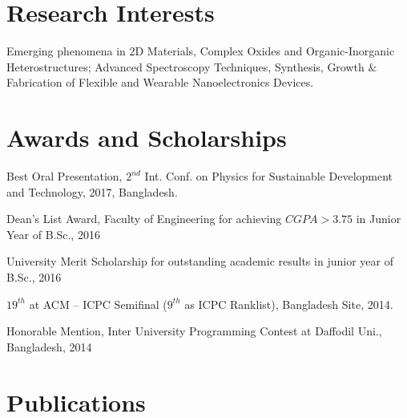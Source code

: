 \documentclass[letterpaper,20pt]{article}
\begin{document}
\vspace{0pt}
\section{Research Interests}
	Emerging phenomena in 2D Materials, Complex Oxides and Organic-Inorganic Heterostructures; Advanced Spectroscopy Techniques, Synthesis, Growth $\&$ Fabrication of Flexible and Wearable Nanoelectronics Devices.\\

\vspace{0pt}
\section{Awards and Scholarships}
	\begin{description}[font=$\bullet$]
		\item{Best Oral Presentation, $2^{nd}$ Int. Conf. on Physics for Sustainable Development and Technology, 2017, Bangladesh.}
		\vspace{-5pt}
		\item {Dean's List Award, Faculty of Engineering for achieving $CGPA>3.75$ in Junior Year of B.Sc., 2016}
		\vspace{-5pt}
		\item {University Merit Scholarship for outstanding academic results in junior year of B.Sc., 2016}
		\vspace{-5pt}
		\item {$19^{th}$ at ACM – ICPC Semifinal ($9^{th}$ as ICPC Ranklist), Bangladesh Site, 2014.}
		\vspace{-5pt}
		\item {Honorable Mention, Inter University Programming Contest at Daffodil Uni., Bangladesh, 2014}
		
\end{description}

\vspace{-5pt}
\section{Publications}
	\nocite{*}
	
\end{document}

